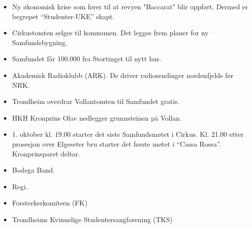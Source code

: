 
\begin{itemize}
  \item Ny økonomisk krise som fører til at revyen "Baccarat" blir oppført. Dermed er begrepet ``Studenter-UKE'' skapt.
\end{itemize}


\begin{itemize}
  \item Cirkustomten selges til kommunen. Det legges frem planer for ny Samfundsbygning.
\end{itemize}


\begin{itemize}
  \item Samfundet får 100.000 fra Stortinget til nytt hus.
\end{itemize}


\begin{itemize}
  \item Akademisk Radioklubb (ARK). De driver radiosendinger nordenfjelds før NRK.
\end{itemize}


\begin{itemize}
  \item Trondheim overdrar Vollantomten til Samfundet gratis.
\end{itemize}


\begin{itemize}
  \item HKH Kronprins Olav nedlegger grunnsteinen på Vollan.
\end{itemize}


\begin{itemize}
  \item 1. oktober kl. 19.00 starter det siste Samfundsmøtet i Cirkus. Kl. 21.00 etter prosesjon over Elgeseter bru starter
det første møtet i ``Cassa Rossa''. Kronprinsparet deltar.
  \item Bodega Band.
  \item Regi.
\end{itemize}


\begin{itemize}
  \item Forsterkerkomiteen (FK)
  \item Trondheims Kvinnelige Studentersangforening (TKS)
\end{itemize}


